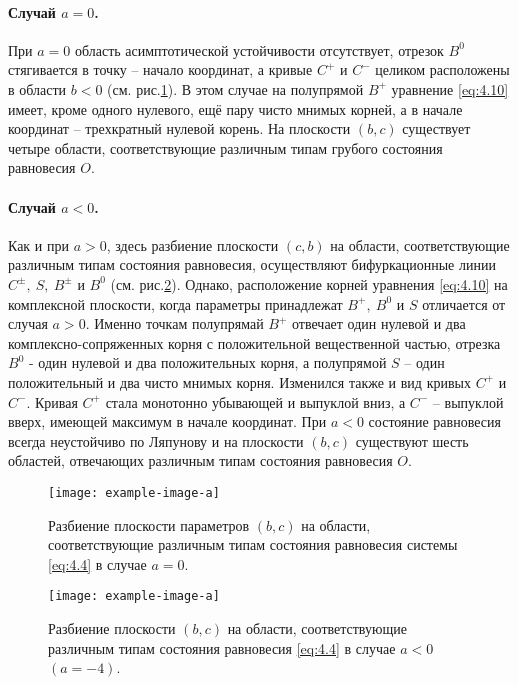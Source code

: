 \paragraph{Случай $a=0$.}%
\label{par:sluchai_a_0_}
При $a=0$ область асимптотической устойчивости отсутствует, отрезок $B^0$ стягивается в точку -- начало координат, а кривые $C^+$ и $C^-$ целиком расположены в области $b<0$ (см. рис.\ref{fig:4.8}). В этом случае на полупрямой $B^+$ уравнение \eqref{eq:4.10} имеет, кроме одного нулевого, ещё пару чисто мнимых корней, а в начале координат -- трехкратный нулевой корень. На плоскости $(b,c)$ существует четыре области, соответствующие различным типам грубого состояния равновесия $O$. 

\paragraph{Случай $a<0$.}%
\label{par:sluchai_a_0_}

Как и при $a>0$, здесь разбиение плоскости $(c,b)$ на области, соответствующие различным типам состояния равновесия, осуществляют бифуркационные линии $C^{\pm},~S,~B^{\pm}$ и $B^0$ (см. рис.\ref{fig:4.9}). Однако, расположение корней уравнения \eqref{eq:4.10} на комплексной плоскости, когда параметры принадлежат $B^+, ~ B^0$ и $S$ отличается от случая $a>0$. Именно точкам полупрямай $B^+$ отвечает один нулевой и два комплексно-сопряженных корня с положительной вещественной частью, отрезка $B^0$ - один нулевой и два положительных корня, а полупрямой $S$ -- один положительный  и  два чисто мнимых корня. Изменился также и вид кривых $C^+$ и $C^-$. Кривая $C^+$ стала монотонно убывающей
и выпуклой вниз, а $C^-$ -- выпуклой вверх, имеющей максимум в начале координат. При $a<0$ состояние равновесия всегда неустойчиво по Ляпунову и на плоскости $(b,c)$ существуют шесть областей, отвечающих различным типам состояния равновесия $O$.

\begin{figure}[h!]
        \centering
        \texttt{[image: example-image-a]}
        \caption{Разбиение плоскости параметров $(b,c)$ на области, соответствующие различным типам состояния равновесия системы \eqref{eq:4.4} в случае $a=0$.}
        \label{fig:4.8}
\end{figure}

\begin{figure}[h!]
        \centering
        \texttt{[image: example-image-a]}
        \caption{Разбиение плоскости $(b,c)$ на области, соответствующие различным типам состояния равновесия \eqref{eq:4.4} в случае $a<0$ $(a=-4)$.}
        \label{fig:4.9}
\end{figure}


